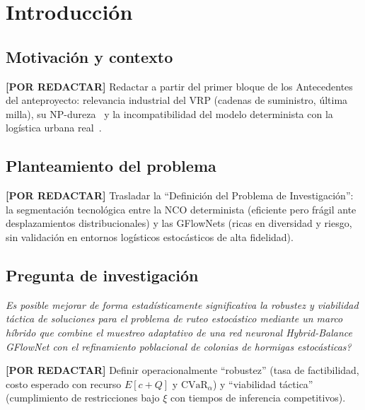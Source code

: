 \documentclass[12pt]{report}
\newcommand{\pendiente}[1]{\par\noindent\colorbox{lightbg}{%
  \begin{minipage}{0.94\linewidth}\small
  \textcolor{uanlgold}{\textbf{[POR REDACTAR]}} #1
  \end{minipage}}\par\medskip}
\begin{document}
\chapter{Introducci\'on}\label{cap:intro}

\section{Motivaci\'on y contexto}\label{sec:motivacion}
\pendiente{Redactar a partir del primer bloque de los Antecedentes del
anteproyecto: relevancia industrial del VRP (cadenas de suministro, \'ultima
milla), su NP-dureza~\cite{Lenstra1981Complexity} y la incompatibilidad del
modelo determinista con la log\'istica urbana real~\cite{Heakl2025SVRP}.}

\section{Planteamiento del problema}\label{sec:problema}
\pendiente{Trasladar la ``Definici\'on del Problema de Investigaci\'on'': la
segmentaci\'on tecnol\'ogica entre la NCO determinista (eficiente pero fr\'agil
ante desplazamientos distribucionales) y las GFlowNets (ricas en diversidad y
riesgo, sin validaci\'on en entornos log\'isticos estoc\'asticos de alta
fidelidad).}

\section{Pregunta de investigaci\'on}\label{sec:pregunta}
\begin{center}
  \colorbox{lightbg}{%
    \begin{minipage}{0.85\textwidth}
      \vspace{0.4cm}
      \centering
      \textit{\guillemotleft\textquestiondown Es posible mejorar de forma
      estad\'isticamente significativa la robustez y viabilidad t\'actica de
      soluciones para el problema de ruteo estoc\'astico mediante un marco
      h\'ibrido que combine el muestreo adaptativo de una red neuronal
      Hybrid-Balance GFlowNet con el refinamiento poblacional de colonias de
      hormigas estoc\'asticas?\guillemotright}
      \vspace{0.4cm}
    \end{minipage}%
  }
\end{center}
\pendiente{Definir operacionalmente ``robustez'' (tasa de factibilidad, costo
esperado con recurso $E[c+Q]$ y $\mathrm{CVaR}_\alpha$) y ``viabilidad
t\'actica'' (cumplimiento de restricciones bajo $\xi$ con tiempos de inferencia
competitivos).}
\end{document}
